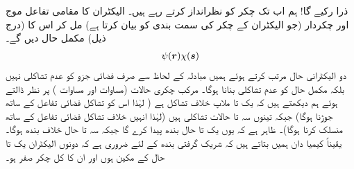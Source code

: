 ذرا رکیے گا!   ہم اب تک  چکر کو نظرانداز کرتے رہے ہیں۔ الیکٹران کا مقامی  تفاعل موج   اور      چکردار (جو الیکٹران کے چکر کی سمت بندی کو بیان کرتا ہے) مل کر اس کا  (درج ذیل)  مکمل حال دیں گے۔
\begin{align}
	\psi({{\boldsymbol{r}}})\chi({{\boldsymbol{s}}})
\end{align}
دو الیکٹرانی حال مرتب کرتے  ہوئے ہمیں  مبادلہ کے لحاظ سے   صرف فضائی جزو کو عدم تشاکلی  نہیں   بلکہ  مکمل حال  کو   عدم تشاکلی بنانا ہوگا۔ مرکب چکری حالات (مساوات   اور مساوات )   پر نظر ڈالتے ہوئے ہم دیکھتے ہیں کہ یک تا ملاپ خلاف تشاکل ہے ( لہٰذا اس کو تشاکل فضائی تفاعل کے ساتھ جوڑنا ہوگا)  جبکہ تینوں  سہ تا حالات تشاکلی ہیں (لہٰذا انہیں خلاف تشاکل فضائی تفاعل کے ساتھ منسلک کرنا ہوگا)۔ ظاہر ہے کہ یوں یک تا حال بندھ   پیدا کرے گا جبکہ سہ تا حال خلاف بندھ  ہوگا۔ یقیناً  کیمیا دان  ہمیں بتاتے ہیں کہ شریک گرفتی بندھ کے لئے ضروری ہے کہ دونوں الیکٹران یک تا حال کے مکین ہوں اور  ان کا کل چکر صفر ہو۔



